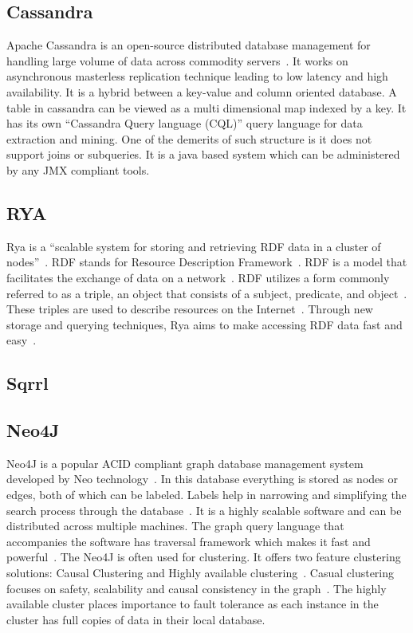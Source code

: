 \subsection{Cassandra}

Apache Cassandra is an open-source distributed database management for
handling large volume of data across commodity
servers~\cite{www-cassandra}. It works on asynchronous masterless
replication technique leading to low latency and high availability. It
is a hybrid between a key-value and column oriented database. A table
in cassandra can be viewed as a multi dimensional map indexed by a
key. It has its own ``Cassandra Query language (CQL)'' query language
for data extraction and mining. One of the demerits of such structure
is it does not support joins or subqueries. It is a java based system
which can be administered by any JMX compliant tools.

     \pv

\subsection{RYA}

Rya is a ``scalable system for storing and retrieving RDF data in a
cluster of nodes''~\cite{Punnoose}. RDF stands for Resource
Description Framework~\cite{Punnoose}. RDF is a model that facilitates
the exchange of data on a network~\cite{w3}. RDF utilizes a form
commonly referred to as a triple, an object that consists of a
subject, predicate, and object~\cite{Punnoose}.  These triples are
used to describe resources on the Internet~\cite{Punnoose}. Through
new storage and querying techniques, Rya aims to make accessing RDF
data fast and easy~\cite{apacherya}.

     \pv
     
\subsection{Sqrrl}

\pv 

\subsection{Neo4J}

Neo4J is a popular ACID compliant graph database management system
developed by Neo technology~\cite{www-wiki-neo4j}.  In this database
everything is stored as nodes or edges, both of which can be
labeled. Labels help in narrowing and simplifying the search process
through the database~\cite{www-slideshare}. It is a highly scalable
software and can be distributed across multiple machines.  The graph
query language that accompanies the software has traversal framework
which makes it fast and powerful~\cite{www-neo4j}. The Neo4J is often
used for clustering. It offers two feature clustering solutions:
Causal Clustering and Highly available
clustering~\cite{www-neo4j-causal-cluster}. Casual clustering focuses
on safety, scalability and causal consistency in the
graph~\cite{www-neo4j-HA-cluster}. The highly available cluster places
importance to fault tolerance as each instance in the cluster has full
copies of data in their local database.

